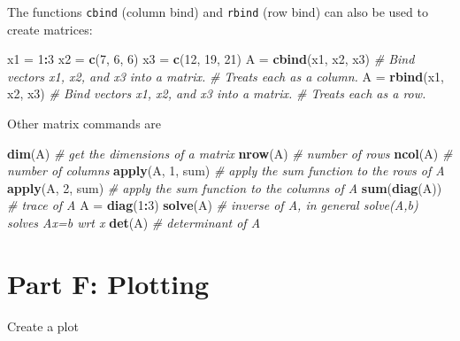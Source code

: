 \documentclass[]{article}
\newenvironment{Shaded}{\begin{snugshade}}{\end{snugshade}}
\newcommand{\KeywordTok}[1]{\textcolor[rgb]{0.13,0.29,0.53}{\textbf{#1}}}
\newcommand{\DecValTok}[1]{\textcolor[rgb]{0.00,0.00,0.81}{#1}}
\newcommand{\StringTok}[1]{\textcolor[rgb]{0.31,0.60,0.02}{#1}}
\newcommand{\CommentTok}[1]{\textcolor[rgb]{0.56,0.35,0.01}{\textit{#1}}}
\newcommand{\OperatorTok}[1]{\textcolor[rgb]{0.81,0.36,0.00}{\textbf{#1}}}
\newcommand{\NormalTok}[1]{#1}
\begin{document}
The functions \texttt{cbind} (column bind) and \texttt{rbind} (row bind)
can also be used to create matrices:

\begin{Shaded}
\begin{Highlighting}[]
\NormalTok{x1 =}\StringTok{ }\DecValTok{1}\OperatorTok{:}\DecValTok{3}
\NormalTok{x2 =}\StringTok{ }\KeywordTok{c}\NormalTok{(}\DecValTok{7}\NormalTok{, }\DecValTok{6}\NormalTok{, }\DecValTok{6}\NormalTok{)}
\NormalTok{x3 =}\StringTok{ }\KeywordTok{c}\NormalTok{(}\DecValTok{12}\NormalTok{, }\DecValTok{19}\NormalTok{, }\DecValTok{21}\NormalTok{)}
\NormalTok{A =}\StringTok{ }\KeywordTok{cbind}\NormalTok{(x1, x2, x3)  }\CommentTok{# Bind vectors x1, x2, and x3 into a matrix.}
\CommentTok{# Treats each as a column.}
\NormalTok{A =}\StringTok{ }\KeywordTok{rbind}\NormalTok{(x1, x2, x3)  }\CommentTok{# Bind vectors x1, x2, and x3 into a matrix.}
\CommentTok{# Treats each as a row.}
\end{Highlighting}
\end{Shaded}

Other matrix commands are

\begin{Shaded}
\begin{Highlighting}[]
\KeywordTok{dim}\NormalTok{(A)  }\CommentTok{# get the dimensions of a matrix}
\KeywordTok{nrow}\NormalTok{(A)  }\CommentTok{# number of rows}
\KeywordTok{ncol}\NormalTok{(A)  }\CommentTok{# number of columns}
\KeywordTok{apply}\NormalTok{(A, }\DecValTok{1}\NormalTok{, sum)  }\CommentTok{# apply the sum function to the rows of A}
\KeywordTok{apply}\NormalTok{(A, }\DecValTok{2}\NormalTok{, sum)  }\CommentTok{# apply the sum function to the columns of A}
\KeywordTok{sum}\NormalTok{(}\KeywordTok{diag}\NormalTok{(A))  }\CommentTok{# trace of A}
\NormalTok{A =}\StringTok{ }\KeywordTok{diag}\NormalTok{(}\DecValTok{1}\OperatorTok{:}\DecValTok{3}\NormalTok{)}
\KeywordTok{solve}\NormalTok{(A)  }\CommentTok{# inverse of A, in general solve(A,b) solves Ax=b wrt x}
\KeywordTok{det}\NormalTok{(A)  }\CommentTok{# determinant of A}
\end{Highlighting}
\end{Shaded}

\section{Part F: Plotting}\label{part-f-plotting}

Create a plot
\end{document}
